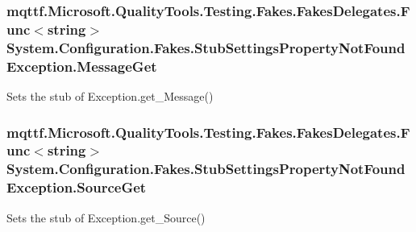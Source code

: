 \hypertarget{class_system_1_1_configuration_1_1_fakes_1_1_stub_settings_property_not_found_exception_aeb3489da033851909125d6a96805ead1}{
\subsubsection[{Message\-Get}]{\setlength{\rightskip}{0pt plus 5cm}mqttf.\-Microsoft.\-Quality\-Tools.\-Testing.\-Fakes.\-Fakes\-Delegates.\-Func$<$string$>$ System.\-Configuration.\-Fakes.\-Stub\-Settings\-Property\-Not\-Found\-Exception.\-Message\-Get}}\label{class_system_1_1_configuration_1_1_fakes_1_1_stub_settings_property_not_found_exception_aeb3489da033851909125d6a96805ead1}


Sets the stub of Exception.\-get\-\_\-\-Message()

\hypertarget{class_system_1_1_configuration_1_1_fakes_1_1_stub_settings_property_not_found_exception_afc528ec62f49e1ea8eb2aeccb2a844bc}{
\subsubsection[{Source\-Get}]{\setlength{\rightskip}{0pt plus 5cm}mqttf.\-Microsoft.\-Quality\-Tools.\-Testing.\-Fakes.\-Fakes\-Delegates.\-Func$<$string$>$ System.\-Configuration.\-Fakes.\-Stub\-Settings\-Property\-Not\-Found\-Exception.\-Source\-Get}}\label{class_system_1_1_configuration_1_1_fakes_1_1_stub_settings_property_not_found_exception_afc528ec62f49e1ea8eb2aeccb2a844bc}


Sets the stub of Exception.\-get\-\_\-\-Source()

